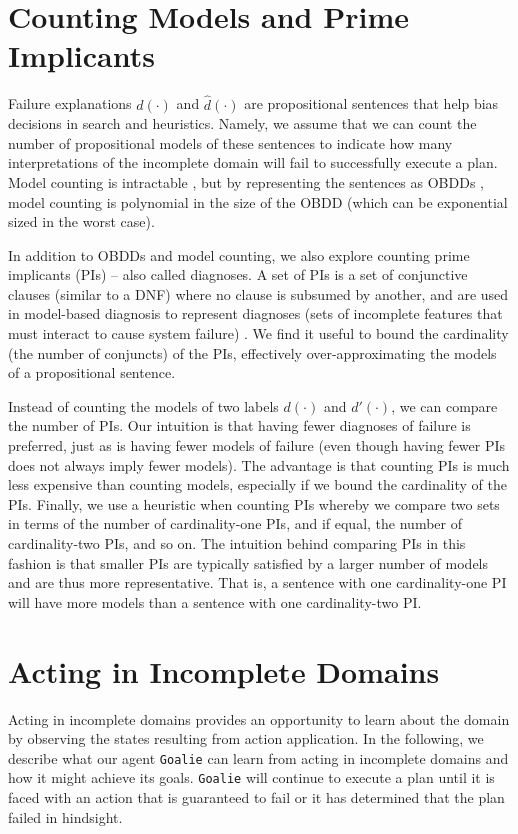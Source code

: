 \documentclass{article}
\def\citep#1{\cite{#1}} \def\citet#1{\citeA{#1}}
\def\goalie{{\tt Goalie}}
\begin{document}
\section{Counting Models and Prime Implicants }

Failure explanations $d(\cdot)$ and $\hat{d}(\cdot)$ are propositional sentences that help bias decisions in search and heuristics.  Namely, we assume that we can count the number of propositional models of these sentences to indicate how many interpretations of the incomplete domain will fail to successfully execute a plan.  Model counting is intractable \citep{Roth96}, but by representing the sentences as OBDDs \citep{bryant-ieeetc86}, model counting is polynomial in the size of the OBDD \citep{darwiche} (which can be exponential sized in the worst case).  

In addition to OBDDs and model counting, we also explore counting prime implicants (PIs) -- also called diagnoses.  A set of PIs is a set of conjunctive clauses (similar to a DNF) where no clause is subsumed by another, and are used in model-based diagnosis to represent diagnoses (sets of incomplete features that must interact to cause system failure) \citep{dekleer}.  We find it useful to bound the cardinality (the number of conjuncts) of the PIs, effectively over-approximating the models of a propositional sentence.  

Instead of counting the models of two labels $d(\cdot)$ and $d'(\cdot)$, we can compare the number of PIs.  Our intuition is that having fewer diagnoses of failure is preferred, just as is having fewer models of failure (even though having fewer PIs does not always imply fewer models).  The advantage is that counting PIs is much less expensive than counting models, especially if we bound the cardinality of the PIs.  Finally, we use a heuristic when counting PIs whereby we compare two sets in terms of the number of cardinality-one PIs, and if equal, the number of cardinality-two PIs, and so on.  The intuition behind comparing PIs in this fashion is that smaller PIs are typically satisfied by a larger number of models and are thus more representative.  That is, a sentence with one cardinality-one PI will have more models than a sentence with one cardinality-two PI.

\section{Acting in Incomplete Domains} Acting in incomplete domains provides an opportunity to learn about the domain by observing the states resulting from action application.  In the following, we describe what our agent \goalie{} can learn from acting in incomplete domains and how it might achieve its goals.  
\goalie{} will continue to execute a plan until it is faced with an action that is guaranteed to fail or it has determined that the plan failed in hindsight.
\end{document}

